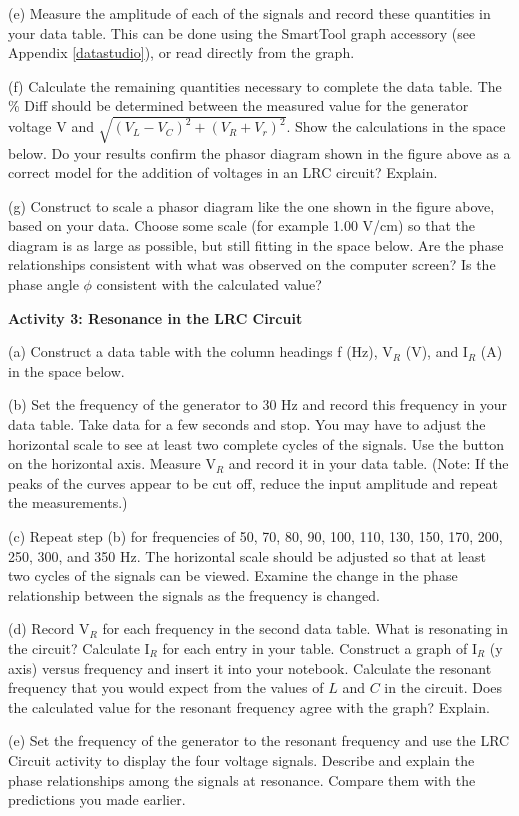 (e) Measure the amplitude of each of the signals and record these
quantities in your data table. This can be done using the SmartTool graph
accessory (see Appendix \ref{datastudio}), or read directly from the graph.

(f) Calculate the remaining quantities necessary to complete the data
table. The \% Diff should be determined between the measured value
for the generator voltage V and \( \sqrt{(V_{L}-V_{C})^{2}+(V_{R}+V_{r})^{2}} \).
Show the calculations in the space below. Do your
results confirm the phasor diagram shown in the figure above as a
correct model for the addition of voltages in an LRC circuit? Explain.
\vspace{4in}

(g) Construct to scale a phasor diagram like the one shown in the
figure above, based on your data. Choose some scale (for example
1.00 V/cm) so that the diagram is as large as possible, but still fitting 
in the space below. Are the phase relationships consistent
with what was observed on the computer screen? Is the phase angle
\( \phi  \) consistent with the calculated value?
\vspace{3.5in}

\textbf{Activity 3: Resonance in the LRC Circuit }

(a) Construct a data table with the column headings f (Hz),
V\( _{R} \) (V), and I\(_R \) (A) in the space below.
\vspace{3in}

(b) Set the frequency of the generator to 30 Hz and record this
frequency in your data table. Take data for a few seconds and stop. You may
have to adjust the horizontal scale to see at least two complete
cycles of the signals. Use the button on the horizontal axis.
Measure V\( _{R} \)  and record it in your data table. (Note: If the peaks 
of the curves appear
to be cut off, reduce the input amplitude and repeat the measurements.)

(c) Repeat step (b) for frequencies of 50, 70, 80, 90,
100, 110, 130, 150, 170, 200, 250, 300, and 350 Hz. The \textbf{}horizontal scale \textbf{}should
be adjusted so that at least two cycles of the signals can be viewed.
Examine the change in the phase relationship between the signals as
the frequency is changed. 

(d) Record V\( _{R} \)  for each
frequency in the second data table. What is resonating in the
circuit? Calculate I\(_R\) for each entry in your table.
Construct a graph of I\( _{R} \)
(y axis) versus frequency and insert it into your notebook. Calculate
the resonant frequency that you would expect from the values of $L$
and $C$ in the circuit. Does the calculated value for the resonant frequency
agree with the graph? Explain.
\vspace{40mm}

(e) Set the frequency of the generator to the resonant
frequency and use the LRC Circuit activity to display the
four voltage signals. Describe and explain the phase relationships
among the signals at resonance. Compare them with the predictions
you made earlier. \vspace{20mm}


